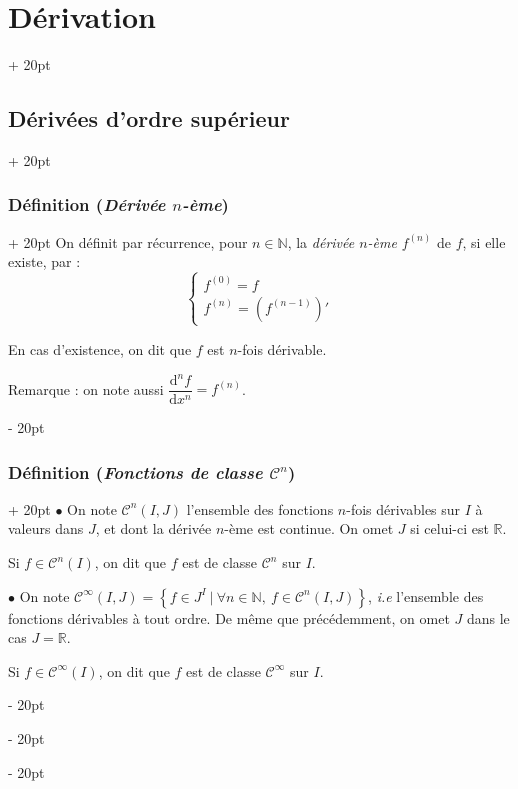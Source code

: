 \documentclass[a4paper, 12pt, twoside]{article}
\newcommand{\N}{\mathbb{N}} %
\newcommand{\R}{\mathbb{R}} %
\newcommand{\lr}[1]{\left( #1 \right)}
\newcommand{\set}[1]{\left\{ #1 \right\}}
\newcommand{\ind}[1][20pt]{\advance\leftskip + #1}
\newcommand{\deind}[1][20pt]{\advance\leftskip - #1}
\newenvironment{indt}[2][20pt]{#2 \par \ind[#1]}{\par \deind} %
\begin{document}
\begin{indt}{\section{Dérivation}}
\begin{indt}{\subsection{Dérivées d'ordre supérieur}}
\begin{indt}{\subsubsection{Définition (\textit{Dérivée $n$-ème})}}
                On définit par récurrence, pour $n \in \N$, la \textit{dérivée $n$-ème} $f^{(n)}$ de $f$, si elle existe, par :
                \[
                    \begin{cases}
                        f^{(0)} = f
                        \\
                        f^{(n)} = \lr{f^{(n - 1)}}'
                    \end{cases}
                \]

                En cas d'existence, on dit que $f$ est $n$-fois dérivable.

                \vspace{6pt}
                
                Remarque : on note aussi $\dfrac{\mathrm d^n f}{\mathrm dx^n} = f^{(n)}$.
            \end{indt}

            \vspace{12pt}
            
            \begin{indt}{\subsubsection{Définition (\textit{Fonctions de classe $\mathcal C^n$})}}
                $\bullet$ On note $\mathcal C^n(I, J)$ l'ensemble des fonctions $n$-fois dérivables sur $I$ à valeurs dans $J$, et dont la dérivée $n$-ème est continue.
                On omet $J$ si celui-ci est $\R$.

                Si $f \in \mathcal C^n(I)$, on dit que $f$ est de classe $\mathcal C^n$ sur $I$.

                \vspace{6pt}
                
                $\bullet$ On note
                $
                    \mathcal C^\infty(I, J)
                    = \set{f \in J^I\ |\ \forall n \in \N,\ f \in \mathcal C^n(I, J)}
                $,
                \textit{i.e} l'ensemble des fonctions dérivables à tout ordre.
                De même que précédemment, on omet $J$ dans le cas $J = \R$.

                Si $f \in \mathcal C^\infty(I)$, on dit que $f$ est de classe $\mathcal C^\infty$ sur $I$.
            \end{indt}

            \vspace{12pt}
            

\end{indt}
\end{indt}
\end{document}
